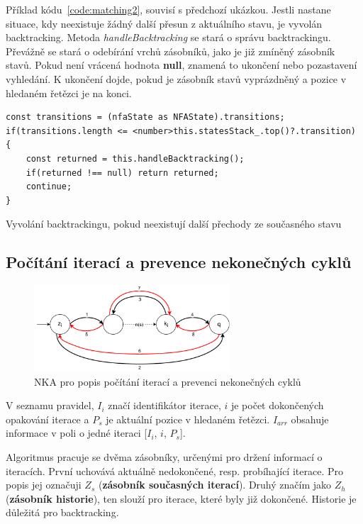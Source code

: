 Příklad kódu~\ref{code:matching2}, souvisí s předchozí ukázkou. 
Jestli nastane situace, kdy neexistuje žádný další přesun z aktuálního stavu, je vyvolán backtracking.
Metoda \textit{handleBacktracking} se stará o správu backtrackingu.
Převážně se stará o odebírání vrchů zásobníků, jako je již zmíněný zásobník stavů.
Pokud není vrácená hodnota \textbf{null}, znamená to ukončení nebo pozastavení vyhledání.
K ukončení dojde, pokud je zásobník stavů vyprázdněný a pozice v hledaném řetězci je na konci.

\begin{code}[!ht]
	\begin{verbatim}
const transitions = (nfaState as NFAState).transitions;
if(transitions.length <= <number>this.statesStack_.top()?.transition)
{
	const returned = this.handleBacktracking();
	if(returned !== null) return returned;
	continue;
}
	\end{verbatim}
	\caption{Vyvolání backtrackingu, pokud neexistují další přechody ze současného stavu}
	\label{code:matching2}
\end{code}

\newpage

\subsection*{Počítání iterací a prevence nekonečných cyklů}

\begin{figure}[!h]
	\centering
	\includegraphics[width=0.65\textwidth]{Figures/IterationCount.pdf}
	\caption{NKA pro popis počítání iterací a prevenci nekonečných cyklů}
	\label{fig:ITERCNT}
\end{figure}

V seznamu pravidel, $I_i$ značí identifikátor iterace, $i$ je počet dokončených opakování iterace a $P_s$ je aktuální pozice v hledaném řetězci.
$I_{arr}$ obsahuje informace v poli o jedné iteraci [$I_i$, $i$, $P_s$].

Algoritmus pracuje se dvěma zásobníky, určenými pro držení informací o iteracích. 
První uchovává aktuálně nedokončené, resp. probíhající iterace. 
Pro popis jej označuji $Z_s$ (\textbf{zásobník současných iterací}).
Druhý značím jako $Z_h$ (\textbf{zásobník historie}), ten slouží pro iterace, které byly již dokončené.
Historie je důležitá pro backtracking.

